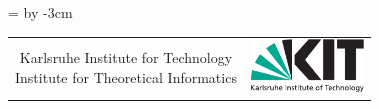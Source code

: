 { %
\footnotesize\sffamily
\newdimen\addresswidth
\addresswidth=\textwidth
\advance\addresswidth by -3cm
\noindent\begin{tabular}{@{}c@{}c@{}}
\parbox{\addresswidth}{Karlsruhe Institute for Technology\\Institute for Theoretical Informatics} & \parbox{3cm}{\includegraphics[width=3cm]{./logos/kit-en.pdf}}
\end{tabular}
} %

\vspace{\baselineskip}

\begin{center}
\makeatletter
{\Large\bfseries\@title\\}
\vspace{\baselineskip}
{
\@author\\
\@subtitle{}\\
\@date
\makeatother
}
\end{center}

\vspace{\baselineskip}
